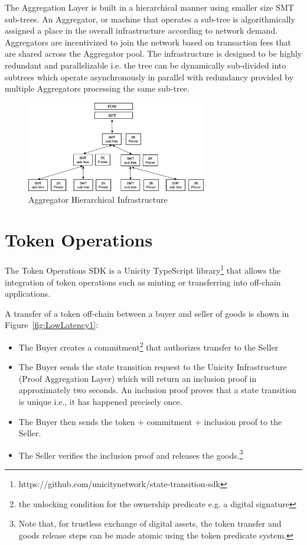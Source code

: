 \documentclass{article}
\begin{document}
The Aggregation Layer is built in a hierarchical manner using smaller size SMT sub-trees. An Aggregator, or machine that operates a sub-tree is algorithmically assigned a place in the overall infrastructure according to network demand. Aggregators are incentivized to join the network based on transaction fees that are shared across the Aggregator pool. The infrastructure is designed to be highly redundant and parallelizable i.e. the tree can be dynamically sub-divided into subtrees which operate asynchronously in parallel with redundancy provided by multiple Aggregators processing the same sub-tree. 
\newline
\newline

\begin{figure}[htbp]
    \centering
    \includegraphics[width=0.7\textwidth]{SMT-ProverMarketPlace.png}
    \caption{Aggregator Hierarchical Infrastructure}
    \label{fig:SMT-Infra}
\end{figure}


\section{Token Operations}




The Token Operations SDK is a Unicity TypeScript library\footnote{https://github.com/unicitynetwork/state-transition-sdk} that allows the integration of token operations such as minting or transferring into off-chain applications.



A transfer of a token off-chain between a buyer and seller of goods is shown in Figure~\ref{fig:LowLatency1}:

\begin{itemize}
  \item The Buyer creates a commitment\footnote{the unlocking condition for the ownership predicate e.g. a digital signature} that authorizes transfer to the Seller
  \item The Buyer sends the state transition request to the Unicity Infrastructure (Proof Aggregation Layer) which will return an inclusion proof in approximately two seconds. An inclusion proof proves that a state transition is unique i.e., it has happened precisely once. 
  \item The Buyer then sends the token + commitment + inclusion proof to the Seller.
  \item The Seller verifies the inclusion proof and releases the goods.\footnote{Note that, for trustless exchange of digital assets, the token transfer and goods release steps can be made atomic using the token predicate system.}
\end{itemize}
\end{document}
